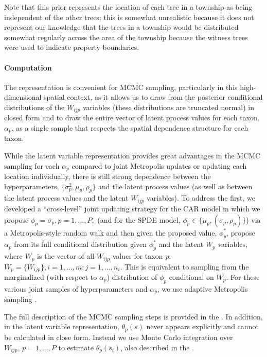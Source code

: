 \documentclass[10pt,letterpaper]{article}
\begin{document}
Note that this prior represents the location of each tree in a township
as being independent of the other trees; this is somewhat unrealistic
because it does not represent our knowledge that the trees in a township
would be distributed somewhat regularly across the area of the township
because the witness trees were used to indicate property boundaries.


\paragraph*{Computation}

The \cite{McCu:Ross:1994} representation is convenient for MCMC sampling,
particularly in this high-dimensional spatial context, as it allows
us to draw from the posterior conditional distributions of the $W_{ijp}$
variables (these distributions are truncated normal) in closed form
and to draw the entire vector of latent process values for each taxon,
$\alpha_{p}$, as a single sample that respects the spatial dependence
structure for each taxon.

While the latent variable representation provides great advantages
in the MCMC sampling for each $\alpha_{p}$ compared to joint Metropolis
updates or updating each location individually, there is still strong
dependence between the hyperparameters, $\{\sigma_{p}^{2},\mu_{p},\rho_{p}\}$
and the latent process values (as well as between the latent process
values and the latent $W_{ijp}$ variables). To address the first,
we developed a ``cross-level'' joint updating strategy for the CAR
model in which we propose $\phi_{p}=\sigma_{p},p=1,\ldots,P,$ (and
for the SPDE model, $\phi_{p}\in\{\mu_{p},(\sigma_{p},\rho_{p})\}$)
via a Metropolis-style random walk and then given the proposed value,
$\phi_{p}^{*}$, propose $\alpha_{p}$ from its full conditional distribution
given $\phi_{p}^{*}$ and the latent $W_{p}$ variables, where $W_{p}$
is the vector of all $W_{ijp}$ values for taxon \emph{p}: $W_{p}=\{W_{ijp}\},i=1,\ldots,m;j=1,\ldots,n_{i}$.
This is equivalent to sampling from the marginalized (with respect
to $\alpha_{p}$) distribution of $\phi_{p}$ conditional on $W_{p}$.
For these various joint samples of hyperparameters and $\alpha_{p}$,
we use adaptive Metropolis sampling \cite{Shab:Well:2011}.

The full description of the MCMC sampling steps is provided in the
. In addition, in the latent variable representation, $\theta_{p}(s)$
never appears explicitly and cannot be calculated in close form. Instead
we use Monte Carlo integration over $W_{ijp},\, p=1,\ldots,P$ to
estimate $\theta_{p}(s_{i})$, also described in the . 
\end{document}
